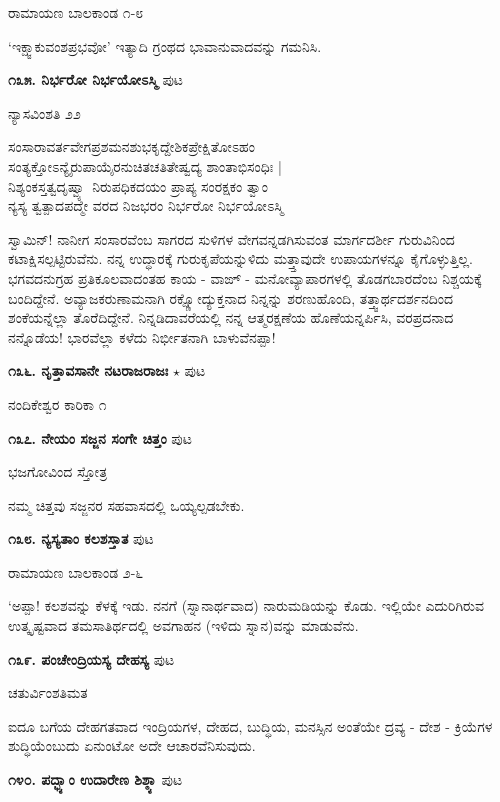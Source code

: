\hfill ರಾಮಾಯಣ ಬಾಲಕಾಂಡ ೧-೮

`ಇಕ್ಷ್ವಾಕುವಂಶಪ್ರಭವೋ' ಇತ್ಯಾದಿ ಗ್ರಂಥದ ಭಾವಾನುವಾದವನ್ನು ಗಮನಿಸಿ.

\medskip
\noindent\textbf{೧೩೫. ನಿರ್ಭರೋ ನಿರ್ಭಯೋಽಸ್ಮಿ} \hfill ಪುಟ \pageref{115}

\hfill ನ್ಯಾಸವಿಂಶತಿ ೨೨

\begin{shloka}
ಸಂಸಾರಾವರ್ತವೇಗಪ್ರಶಮನಶುಭಕೃದ್ದೇಶಿಕಪ್ರೇಕ್ಷಿತೋಽಹಂ\\
ಸಂತ್ಯಕ್ತೋಽನ್ಯೈರುಪಾಯೈರನುಚಿತಚತಿತೇಷ್ವದ್ಯ ಶಾಂತಾಭಿಸಂಧಿಃ |\\
ನಿಶ್ಯಂಕಸ್ತತ್ವದೃಷ್ವ್ಯಾ ನಿರುಪಧಿಕದಯಂ ಪ್ರಾಪ್ಯ ಸಂರಕ್ಷಕಂ ತ್ವಾಂ\\
ನ್ಯಸ್ಯ ತ್ವತ್ಪಾದಪದ್ಮೇ ವರದ ನಿಜಭರಂ ನಿರ್ಭರೋ ನಿರ್ಭಯೋಽಸ್ಮಿ \\
\end{shloka}

ಸ್ವಾಮಿನ್! ನಾನೀಗ ಸಂಸಾರವೆಂಬ ಸಾಗರದ ಸುಳಿಗಳ ವೇಗವನ್ನಡಗಿಸುವಂತ ಮಾರ್ಗದರ್ಶೀ ಗುರುವಿನಿಂದ ಕಟಾಕ್ಷಿಸಲ್ಪಟ್ಟಿರುವೆನು. ನನ್ನ ಉದ್ಧಾರಕ್ಕೆ ಗುರುಕೃಪೆಯನ್ನುಳಿದು ಮತ್ತ್ತಾವುದೇ ಉಪಾಯಗಳನ್ನೂ ಕೈಗೊಳ್ಳುತ್ತಿಲ್ಲ. ಭಗವದನುಗ್ರಹ ಪ್ರತಿಕೂಲವಾದಂತಹ ಕಾಯ - ವಾಙ್ - ಮನೋವ್ಯಾಪಾರಗಳಲ್ಲಿ ತೊಡಗಬಾರದೆಂಬ ನಿಶ್ಚಯಕ್ಕೆ ಬಂದಿದ್ದೇನೆ. ಅವ್ಯಾಜಕರುಣಾಮನಾಗಿ ರಕ್ಷ್ಣೋದ್ಯುಕ್ತನಾದ ನಿನ್ನನ್ನು ಶರಣುಹೊಂದಿ, ತತ್ತ್ವಾರ್ಥದರ್ಶನದಿಂದ ಶಂಕೆಯನ್ನೆಲ್ಲಾ ತೊರೆದಿದ್ದೇನೆ. ನಿನ್ನಡಿದಾವರೆಯಲ್ಲಿ ನನ್ನ ಆತ್ಮರಕ್ಷಣೆಯ ಹೊಣೆಯನ್ನರ್ಪಿಸಿ, ವರಪ್ರದನಾದ ನನ್ನೊಡೆಯ! ಭಾರವೆಲ್ಲಾ ಕಳೆದು ನಿರ್ಭೀತನಾಗಿ ಬಾಳುವೆನಪ್ಪಾ!

\medskip
\noindent\textbf{೧೩೬. ನೃತ್ತಾವಸಾನೇ ನಟರಾಜರಾಜಃ} $\star$ \hfill ಪುಟ \pageref{30}

\hfill ನಂದಿಕೇಶ್ವರ ಕಾರಿಕಾ ೧

\medskip
\noindent\textbf{೧೩೭. ನೇಯಂ ಸಜ್ಜನ ಸಂಗೇ ಚಿತ್ತಂ} \hfill ಪುಟ \pageref{83}

\hfill ಭಜಗೋವಿಂದ ಸ್ತೋತ್ರ

ನಮ್ಮ ಚಿತ್ತವು ಸಜ್ಜನರ ಸಹವಾಸದಲ್ಲಿ ಒಯ್ಯಲ್ಪಡಬೇಕು.

\medskip
\noindent\textbf{೧೩೮. ನ್ಯಸ್ಯತಾಂ ಕಲಶಸ್ತಾತ} \hfill ಪುಟ \pageref{198}

\hfill ರಾಮಾಯಣ ಬಾಲಕಾಂಡ ೨-೬

`ಅಪ್ಪಾ! ಕಲಶವನ್ನು ಕೆಳಕ್ಕೆ ಇಡು. ನನಗೆ (ಸ್ನಾನಾರ್ಥವಾದ) ನಾರುಮಡಿಯನ್ನು ಕೊಡು. ಇಲ್ಲಿಯೇ ಎದುರಿಗಿರುವ ಉತ್ಕೃಷ್ಟವಾದ ತಮಸಾತಿರ್ಥದಲ್ಲಿ ಅವಗಾಹನ (ಇಳಿದು ಸ್ನಾನ)ವನ್ನು ಮಾಡುವೆನು.

\medskip
\noindent\textbf{೧೩೯. ಪಂಚೇಂದ್ರಿಯಸ್ಯ ದೇಹಸ್ಯ} \hfill ಪುಟ \pageref{139}

\hfill ಚತುರ್ವಿಂಶತಿಮತ

ಐದೂ ಬಗೆಯ ದೇಹಗತವಾದ ಇಂದ್ರಿಯಗಳ, ದೇಹದ, ಬುದ್ಧಿಯ, ಮನಸ್ಸಿನ ಅಂತೆಯೇ ದ್ರವ್ಯ - ದೇಶ - ಕ್ರಿಯೆಗಳ ಶುದ್ಧಿಯೆಂಬುದು ಏನುಂಟೋ ಅದೇ ಆಚಾರವೆನಿಸುವುದು. 

\medskip
\noindent\textbf{೧೪೦. ಪದ್ಭ್ಯಾಂ ಉದಾರೇಣ ಶಿಶ್ಠ್ಯಾ} \hfill ಪುಟ \pageref{26}

